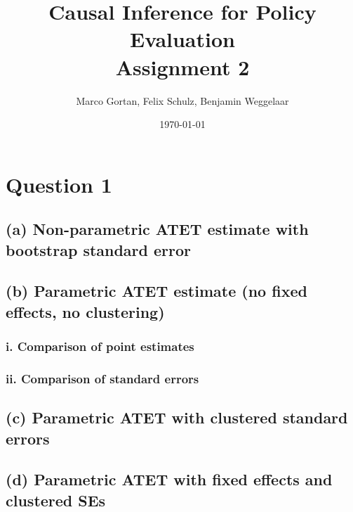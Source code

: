 \documentclass{scrartcl}
\title{Causal Inference for Policy Evaluation\\
\Large{Assignment 2}}
\author{Marco Gortan, Felix Schulz, Benjamin Weggelaar}
\date{\today}
\begin{document}
\maketitle

\section*{Question 1}

\subsection*{(a) Non-parametric ATET estimate with bootstrap standard error}



\subsection*{(b) Parametric ATET estimate (no fixed effects, no clustering)}



\subsubsection*{i. Comparison of point estimates}


\subsubsection*{ii. Comparison of standard errors}


\subsection*{(c) Parametric ATET with clustered standard errors}


\subsection*{(d) Parametric ATET with fixed effects and clustered SEs}
\end{document}
